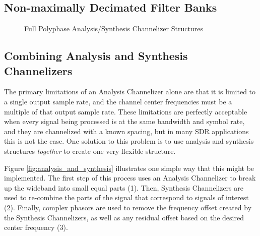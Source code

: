 \documentclass[12pt]{article}
\begin{document}
\subsection{Non-maximally Decimated Filter Banks}
\begin{figure}[h!]
\centerline{
    \hfill
}
\caption{Full Polyphase Analysis/Synthesis Channelizer Structures}
\label{fig:poly_analysis_synthesis_nmdfb}
\end{figure}

\subsection{Combining Analysis and Synthesis Channelizers}
\label{sec:combine_analysis_synthesis}
The primary limitations of an Analysis Channelizer alone are that it is limited
to a single output sample rate, and the channel center frequencies must be
a multiple of that output sample rate. These limitations are perfectly
acceptable when every signal being processed is at the same bandwidth and
symbol rate, and they are channelized with a known spacing, but in many SDR
applications this is not the case. One solution to this problem is to use
analysis and synthesis structures \emph{together} to create one very flexible
structure.

Figure \ref{fig:analysis_and_synthesis} illustrates one simple way that this
might be implemented. The first step of this process uses an Analysis
Channelizer to break up the wideband into small equal parts (1). Then,
Synthesis Channelizers are used to re-combine the parts of the signal that
correspond to signals of interest (2). Finally, complex phasors are used to
remove the frequency offset created by the Synthesis Channelizers, as well as
any residual offset based on the desired center frequency (3).
\end{document}
